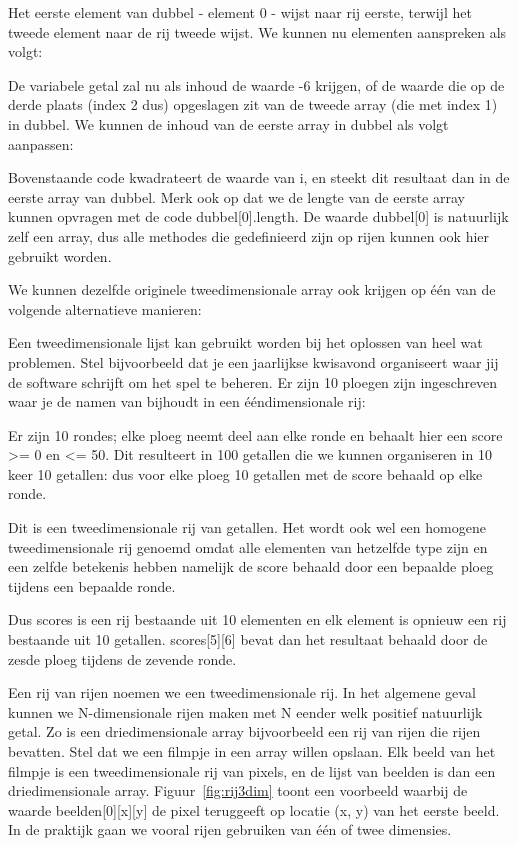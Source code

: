 Het eerste element van dubbel - element 0 - wijst naar rij eerste, terwijl het tweede element naar de rij tweede wijst. We kunnen nu elementen aanspreken als volgt:


De variabele getal zal nu als inhoud de waarde -6 krijgen, of de waarde die op de derde plaats (index 2 dus) opgeslagen zit van de tweede array (die met index 1) in dubbel. We kunnen de inhoud van de eerste array in dubbel als volgt aanpassen:


Bovenstaande code kwadrateert de waarde van i, en steekt dit resultaat dan in de eerste array van dubbel. Merk ook op dat we de lengte van de eerste array kunnen opvragen met de code dubbel[0].length. De waarde dubbel[0] is natuurlijk zelf een array, dus alle methodes die gedefinieerd zijn op rijen kunnen ook hier gebruikt worden.

We kunnen dezelfde originele tweedimensionale array ook krijgen op \'e\'en van de volgende alternatieve manieren:


Een tweedimensionale lijst kan gebruikt worden bij het oplossen van heel wat problemen. Stel bijvoorbeeld dat je een jaarlijkse kwisavond organiseert waar jij de software schrijft om het spel te beheren. Er zijn 10 ploegen zijn ingeschreven waar je de namen van bijhoudt in een \'e\'endimensionale rij:


Er zijn 10 rondes; elke ploeg neemt deel aan elke ronde en behaalt hier een score >= 0 en <= 50. Dit resulteert in 100 getallen die we kunnen organiseren in 10 keer 10 getallen: dus voor elke ploeg 10 getallen met de score behaald op elke ronde.

Dit is een tweedimensionale rij van getallen. Het wordt ook wel een homogene tweedimensionale rij genoemd omdat alle elementen van hetzelfde type zijn en een zelfde betekenis hebben namelijk de score behaald door een bepaalde ploeg tijdens een bepaalde ronde.


Dus scores is een rij bestaande uit 10 elementen en elk element is opnieuw een rij bestaande uit 10 getallen. scores[5][6] bevat dan het resultaat behaald door de zesde ploeg tijdens de zevende ronde.

Een rij van rijen noemen we een tweedimensionale rij. In het algemene geval kunnen we N-dimensionale rijen maken met N eender welk positief natuurlijk getal. Zo is een driedimensionale array bijvoorbeeld een rij van rijen die rijen bevatten. Stel dat we een filmpje in een array willen opslaan. Elk beeld van het filmpje is een tweedimensionale rij van pixels, en de lijst van beelden is dan een driedimensionale array. Figuur~\ref{fig:rij3dim} toont een voorbeeld waarbij de waarde beelden[0][x][y] de pixel teruggeeft op locatie (x, y) van het eerste beeld. In de praktijk gaan we vooral rijen gebruiken van \'e\'en of twee dimensies.

